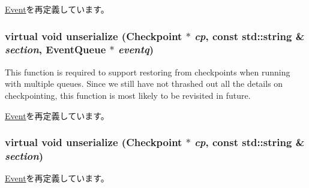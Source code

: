 \hyperlink{classEvent_ad6272f80ae37e8331e3969b3f072a801}{Event}を再定義しています。\hypertarget{classLocalSimLoopExitEvent_a906bb365c627ae3a9ae49fc646d267cf}{
\subsubsection[{unserialize}]{\setlength{\rightskip}{0pt plus 5cm}virtual void unserialize ({\bf Checkpoint} $\ast$ {\em cp}, \/  const std::string \& {\em section}, \/  {\bf EventQueue} $\ast$ {\em eventq})}}
\label{classLocalSimLoopExitEvent_a906bb365c627ae3a9ae49fc646d267cf}
This function is required to support restoring from checkpoints when running with multiple queues. Since we still have not thrashed out all the details on checkpointing, this function is most likely to be revisited in future. 

\hyperlink{classEvent_a906bb365c627ae3a9ae49fc646d267cf}{Event}を再定義しています。\hypertarget{classLocalSimLoopExitEvent_af100c4e9feabf3cd918619c88c718387}{
\subsubsection[{unserialize}]{\setlength{\rightskip}{0pt plus 5cm}virtual void unserialize ({\bf Checkpoint} $\ast$ {\em cp}, \/  const std::string \& {\em section})}}
\label{classLocalSimLoopExitEvent_af100c4e9feabf3cd918619c88c718387}


\hyperlink{classEvent_af100c4e9feabf3cd918619c88c718387}{Event}を再定義しています。

